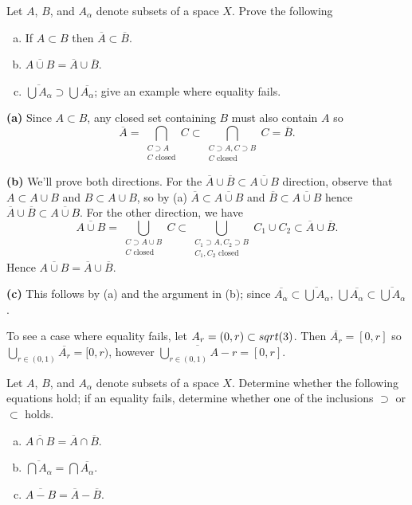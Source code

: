 \documentclass[11pt,letterpaper]{article}
\begin{document}
\begin{problem}
    Let $A$, $B$, and $A_\alpha$ denote subsets of a space $X$. Prove the following
    \begin{enumerate}[(a)]
        \item If $A\subset B$ then $\overline{A}\subset \overline{B}$.
        \item $\overline{A\cup B}=\overline{A}\cup \overline{B}$.
        \item $\overline{\bigcup A_\alpha} \supset \bigcup \overline{A_\alpha}$; give an example where equality fails.
    \end{enumerate}
\end{problem}

\begin{changemargin}{1em}{1em}
    \textbf{(a)} Since $A\subset B$, any closed set containing $B$ must also contain $A$ so 
    \[
        \overline{A} = \bigcap_{\substack{C\supset A\\ C\textrm{ closed}}} C \subset \bigcap_{\substack{C\supset A, C\supset B\\ C\textrm{ closed}}} C = \overline{B}.
    \]      
    
    \textbf{(b)} We'll prove both directions. For the $\overline{A}\cup \overline{B} \subset \overline{A\cup B}$ direction, observe that $A\subset A\cup B$ and $B\subset A\cup B$, so by (a) $\overline{A} \subset \overline{A\cup B}$ and $\overline{B} \subset \overline{A\cup B}$ hence $\overline{A}\cup \overline{B} \subset \overline{A\cup B}$. For the other direction, we have 
    \[
        \overline{A\cup B} = \bigcup_{\substack{C\supset A\cup B\\ C\textrm{ closed}}} C\subset \bigcup_{\substack{C_1\supset A, C_2\supset B\\ C_1, C_2 \textrm{ closed}}} C_1 \cup C_2 \subset \overline{A} \cup \overline{B}.
    \]
    Hence $\overline{A\cup B} = \overline{A} \cup \overline{B}$. 
    
    \textbf{(c)} This follows by (a) and the argument in (b); since $\overline{A_\alpha}\subset \overline{\bigcup A_{\alpha}}$, $\bigcup \overline{A_\alpha} \subset \overline{\bigcup A_\alpha}$.

    To see a case where equality fails, let $A_{r}=(0,r)\subset sqrt(3)$. Then $\overline{A_r}=[0,r]$ so $\bigcup_{r\in (0, 1)} \overline{A_r} = [0,r)$, however $\overline{\bigcup_{r\in (0,1)}A-r}= [0,r]$.    
\end{changemargin}

\begin{problem}
    Let $A$, $B$, and $A_\alpha$ denote subsets of a space $X$. Determine whether the following equations hold; if an equality fails, determine whether one of the inclusions $\supset$ or $\subset$ holds.
    \begin{enumerate}[(a)]
        \item $\overline{A\cap B} = \overline{A}\cap \overline{B}$.
        \item $\overline{\bigcap A_\alpha} = \bigcap \overline{A_\alpha}$.
        \item $\overline{A-B} = \overline{A} - \overline{B}$.
    \end{enumerate}
\end{problem}
\end{document}
